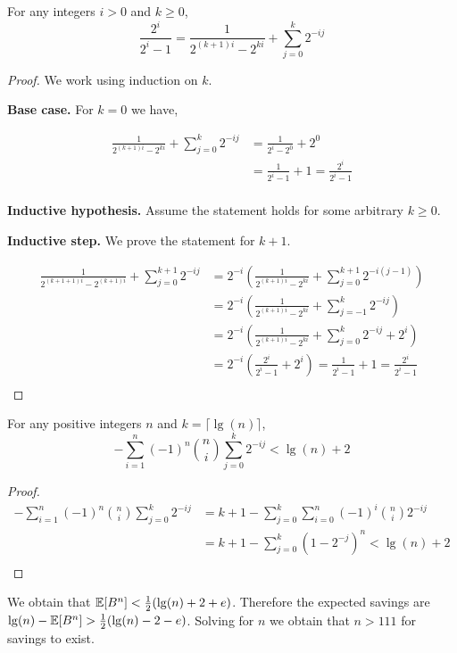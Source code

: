 \begin{lemma}
  For any integers $i > 0$ and $k \ge 0$,
  \[
    \frac{2^i}{2^i-1} = \frac{1}{2^{(k+1)i}-2^{ki}} + \sum_{j=0}^k 2^{-ij}
  \]
\end{lemma}
\begin{proof}
  We work using induction on $k$.

  \noindent
  \textbf{Base case.}
  For $k=0$ we have,

  \begin{align*}
    \frac{1}{2^{(k+1)i}-2^{ki}} + \sum_{j=0}^k 2^{-ij}
    &= \frac{1}{2^i-2^0} + 2^0 \\
    &= \frac{1}{2^i-1} + 1 = \frac{2^i}{2^i-1} \\
  \end{align*}

  \noindent
  \textbf{Inductive hypothesis.}
  Assume the statement holds for some arbitrary $k \ge 0$.

  \noindent
  \textbf{Inductive step.}
  We prove the statement for $k+1$.

  \begin{align*}
    \frac{1}{2^{(k+1+1)i}-2^{(k+1)i}} + \sum_{j=0}^{k+1} 2^{-ij}
    &= 2^{-i} (\frac{1}{2^{(k+1)i}-2^{ki}} + \sum_{j=0}^{k+1} 2^{-i(j-1)}) \\
    &= 2^{-i} (\frac{1}{2^{(k+1)i}-2^{ki}} + \sum_{j=-1}^{k} 2^{-ij}) \\
    &= 2^{-i} (\frac{1}{2^{(k+1)i}-2^{ki}} + \sum_{j=0}^{k} 2^{-ij} + 2^i) \\
    &= 2^{-i} (\frac{2^i}{2^i-1} + 2^i) = \frac{1}{2^i-1} + 1 = \frac{2^i}{2^i-1} \\
  \end{align*}
\end{proof}

\begin{lemma}
  For any positive integers $n$ and $k=\lceil \lg(n) \rceil$,
  \[
    -\sum_{i=1}^n (-1)^n {n \choose i} \sum_{j=0}^k 2^{-ij} < \lg(n) + 2
  \]
\end{lemma}
\begin{proof}
  \begin{align*}
    -\sum_{i=1}^n (-1)^n {n \choose i} \sum_{j=0}^k 2^{-ij}
    &= k+1 - \sum_{j=0}^k \sum_{i=0}^n (-1)^i {n \choose i} 2^{-ij} \\
    &= k+1 - \sum_{j=0}^k (1-2^{-j})^n < \lg(n) + 2 \\
  \end{align*}
\end{proof}

We obtain that $\operatorname{\mathbb{E}}[B^n] < \frac{1}{2}(\lg(n)+2+e)$. Therefore the expected savings are $\lg(n) - \operatorname{\mathbb{E}}[B^n] > \frac{1}{2}(\lg(n)-2-e)$. Solving for $n$ we obtain that $n > 111$ for savings to exist.
